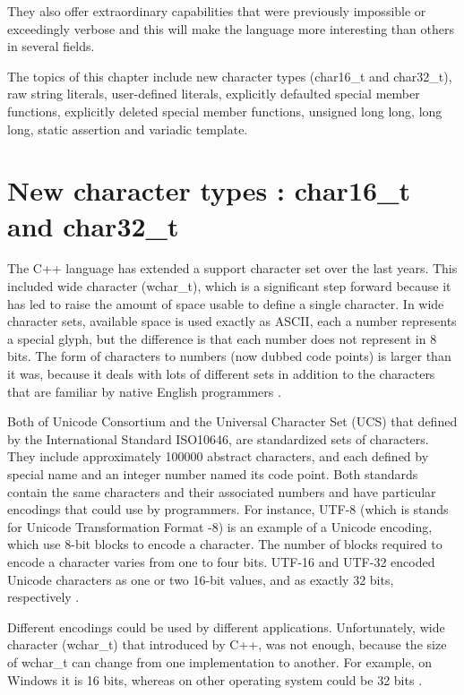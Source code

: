\documentclass[11pt]{report}
\begin{document}
They also offer extraordinary capabilities that were previously impossible or exceedingly verbose and this will make the language more interesting than others in several fields.

The topics of this chapter include new character types (char16\_t and char32\_t), raw string literals, user-defined literals, explicitly defaulted special member functions, explicitly deleted special member functions, unsigned long long, long long, static assertion and variadic template.


\section{New character types : char16\_t and char32\_t}
\label{section: char16_t and char32_t}
The C++ language has extended a support character set over the last years. This included wide character (wchar\_t), which is a significant step forward because it has led to raise the amount of space usable to define a single character. In wide character sets, available space is used exactly as ASCII, each a number represents a special glyph, but the difference is that each number does not represent in 8 bits. The form of characters to numbers (now dubbed code points) is larger than it was, because it deals with lots of different sets in addition to the characters that are familiar by native English programmers \cite{Gregorie:professionalcpp}.


Both of Unicode Consortium and the Universal Character Set (UCS) that defined by the International Standard ISO10646, are standardized sets of characters. They include approximately 100000 abstract characters, and each defined by special name and an integer number named its code point. Both standards contain the same characters and their associated numbers and have particular encodings that could use by programmers. For instance, UTF-8 (which is stands for Unicode Transformation Format -8) is an example of a Unicode encoding, which use 8-bit blocks to encode a character. The number of blocks required to encode a character varies from one to four bits.  UTF-16 and UTF-32 encoded Unicode characters as one or two 16-bit values, and as exactly 32 bits, respectively \cite{Gregorie:professionalcpp}.


Different encodings could be used by different applications. Unfortunately, wide character (wchar\_t) that introduced by C++, was not enough, because the size of wchar\_t can change from one implementation to another. For example, on Windows it is 16 bits, whereas on other operating system could be 32 bits \cite{Gregorie:professionalcpp}. 
\end{document}
